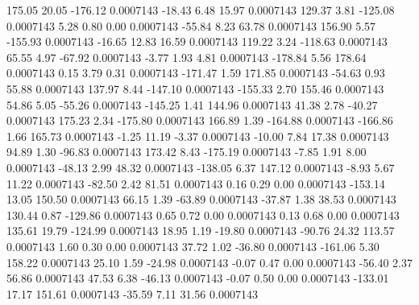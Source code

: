       175.05       20.05     -176.12     0.0007143
      -18.43        6.48       15.97     0.0007143
      129.37        3.81     -125.08     0.0007143
        5.28        0.80        0.00     0.0007143
      -55.84        8.23       63.78     0.0007143
      156.90        5.57     -155.93     0.0007143
      -16.65       12.83       16.59     0.0007143
      119.22        3.24     -118.63     0.0007143
       65.55        4.97      -67.92     0.0007143
       -3.77        1.93        4.81     0.0007143
     -178.84        5.56      178.64     0.0007143
        0.15        3.79        0.31     0.0007143
     -171.47        1.59      171.85     0.0007143
      -54.63        0.93       55.88     0.0007143
      137.97        8.44     -147.10     0.0007143
     -155.33        2.70      155.46     0.0007143
       54.86        5.05      -55.26     0.0007143
     -145.25        1.41      144.96     0.0007143
       41.38        2.78      -40.27     0.0007143
      175.23        2.34     -175.80     0.0007143
      166.89        1.39     -164.88     0.0007143
     -166.86        1.66      165.73     0.0007143
       -1.25       11.19       -3.37     0.0007143
      -10.00        7.84       17.38     0.0007143
       94.89        1.30      -96.83     0.0007143
      173.42        8.43     -175.19     0.0007143
       -7.85        1.91        8.00     0.0007143
      -48.13        2.99       48.32     0.0007143
     -138.05        6.37      147.12     0.0007143
       -8.93        5.67       11.22     0.0007143
      -82.50        2.42       81.51     0.0007143
        0.16        0.29        0.00     0.0007143
     -153.14       13.05      150.50     0.0007143
       66.15        1.39      -63.89     0.0007143
      -37.87        1.38       38.53     0.0007143
      130.44        0.87     -129.86     0.0007143
        0.65        0.72        0.00     0.0007143
        0.13        0.68        0.00     0.0007143
      135.61       19.79     -124.99     0.0007143
       18.95        1.19      -19.80     0.0007143
      -90.76       24.32      113.57     0.0007143
        1.60        0.30        0.00     0.0007143
       37.72        1.02      -36.80     0.0007143
     -161.06        5.30      158.22     0.0007143
       25.10        1.59      -24.98     0.0007143
       -0.07        0.47        0.00     0.0007143
      -56.40        2.37       56.86     0.0007143
       47.53        6.38      -46.13     0.0007143
       -0.07        0.50        0.00     0.0007143
     -133.01       17.17      151.61     0.0007143
      -35.59        7.11       31.56     0.0007143
